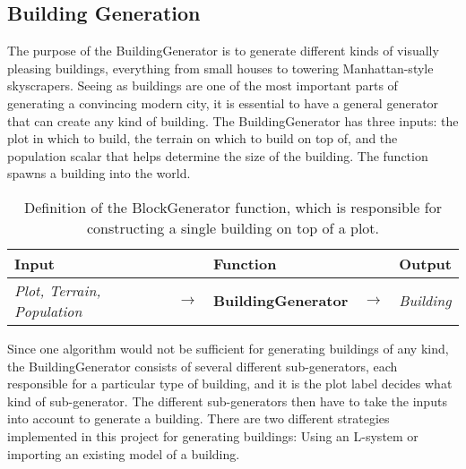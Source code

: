 \subsection{Building Generation}
The purpose of the BuildingGenerator is to generate different kinds of visually pleasing buildings, everything from small houses to towering Manhattan-style skyscrapers. 
Seeing as buildings are one of the most important parts of generating a convincing modern city, it is essential to have a general generator that can create any kind of building. 
The BuildingGenerator has three inputs: the plot in which to build, the terrain on which to build on top of, and the population scalar that helps determine the size of the building.
The function spawns a building into the world. 

\begin{table}[H]
    \centering
    \begin{tabular}{lllll}
      \textbf{Input}                           &               & \textbf{Function}            &               & \textbf{Output}         \\
      \midrule
      \textit{Plot, Terrain, Population}       & $\rightarrow$ & \textbf{BuildingGenerator}   & $\rightarrow$ & \textit{Building}       \\
      \bottomrule
    \end{tabular}
 
    \caption{Definition of the BlockGenerator function, which is responsible for constructing a single building on top of a plot.}
    \label{table:buildinggen}
  \end{table}
  \vspace{-0.4cm} 

Since one algorithm would not be sufficient for generating buildings of any kind, the BuildingGenerator consists of several different sub-generators, each responsible for a particular type of building, and it is the plot label decides what kind of sub-generator. 
The different sub-generators then have to take the inputs into account to generate a building.
There are two different strategies implemented in this project for generating buildings: Using an L-system or importing an existing model of a building. 

